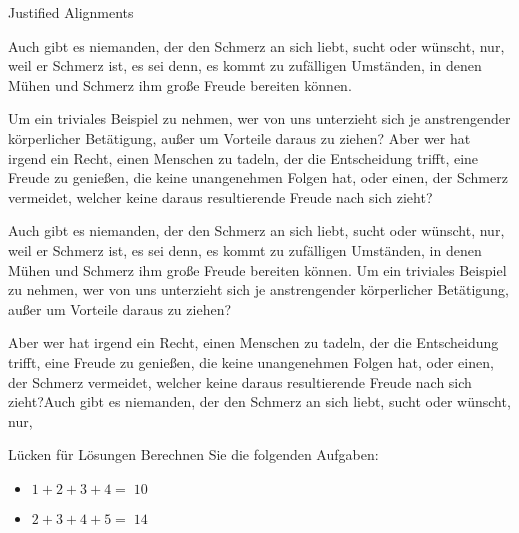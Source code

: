\documentclass[
  ignorenonframetext,
]{beamer}
\providecommand{\tightlist}{%
  \setlength{\itemsep}{0pt}\setlength{\parskip}{0pt}}
\begin{document}
\begin{frame}{Justified Alignments}
\protect\hypertarget{justified-alignments}{}
{\tiny{}

Auch gibt es niemanden, der den Schmerz an sich liebt, sucht oder
wünscht, nur, weil er Schmerz ist, es sei denn, es kommt zu zufälligen
Umständen, in denen Mühen und Schmerz ihm große Freude bereiten können.

\begin{flushright}

Um ein triviales Beispiel zu nehmen, wer von uns unterzieht sich je
anstrengender körperlicher Betätigung, außer um Vorteile daraus zu
ziehen? Aber wer hat irgend ein Recht, einen Menschen zu tadeln, der die
Entscheidung trifft, eine Freude zu genießen, die keine unangenehmen
Folgen hat, oder einen, der Schmerz vermeidet, welcher keine daraus
resultierende Freude nach sich zieht?

\end{flushright}

\begin{flushleft}

Auch gibt es niemanden, der den Schmerz an sich liebt, sucht oder
wünscht, nur, weil er Schmerz ist, es sei denn, es kommt zu zufälligen
Umständen, in denen Mühen und Schmerz ihm große Freude bereiten können.
Um ein triviales Beispiel zu nehmen, wer von uns unterzieht sich je
anstrengender körperlicher Betätigung, außer um Vorteile daraus zu
ziehen?

\end{flushleft}

Aber wer hat irgend ein Recht, einen Menschen zu tadeln, der die
Entscheidung trifft, eine Freude zu genießen, die keine unangenehmen
Folgen hat, oder einen, der Schmerz vermeidet, welcher keine daraus
resultierende Freude nach sich zieht?Auch gibt es niemanden, der den
Schmerz an sich liebt, sucht oder wünscht, nur,

}
\end{frame}

\begin{frame}{Lücken für Lösungen}
\protect\hypertarget{luxfccken-fuxfcr-luxf6sungen}{}
Berechnen Sie die folgenden Aufgaben:

\begin{itemize}
\tightlist
\item
  \(1+2+3+4=\;\){\(10\)}
\item
  \(2+3+4+5=\;\){\(14\)}
\end{itemize}
\end{frame}
\end{document}
